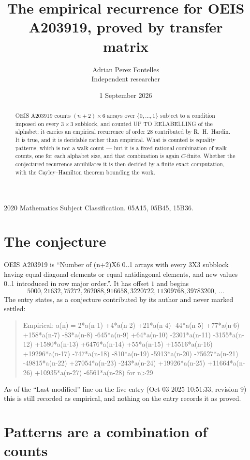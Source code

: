 \documentclass[11pt,a4paper]{article}
\title{The empirical recurrence for OEIS A203919, proved by transfer matrix}
\author{Adrian Perez Fontelles\\ \small Independent researcher}
\date{1 September 2026}
\theoremstyle{plain}
\theoremstyle{definition}
\begin{document}
\maketitle

\begin{abstract}
OEIS A203919 counts $(n+2)\times6$ arrays over $\{0,\dots,1\}$ subject to a condition imposed on
every $3\times3$ subblock, and counted UP TO RELABELLING of the
alphabet; it carries an empirical recurrence of order $28$ contributed by
R.~H.~Hardin. It is true, and it is decidable rather than empirical. What is counted is
equality patterns, which is not a walk count --- but it is a fixed rational combination of
walk counts, one for each alphabet size, and that combination is again $C$-finite. Whether the
conjectured recurrence annihilates it is then decided by a finite exact computation, with the
Cayley--Hamilton theorem bounding the work.
\end{abstract}

\noindent\small 2020 Mathematics Subject Classification. 05A15, 05B45, 15B36.\normalsize

\section{The conjecture}

OEIS A203919 is ``Number of (n+2)X6 0..1 arrays with every 3X3 subblock having equal diagonal elements or equal antidiagonal elements, and new values 0..1 introduced in row major order.''. It has offset $1$ and begins
\[
5000, 21632, 75272, 262088, 916658, 3220722, 11309768, 39783200,\ \dots
\]
The entry states, as a conjecture contributed by its author and never marked settled:
\begin{quote}
Empirical: a(n) = 2*a(n-1) +4*a(n-2) +21*a(n-4) -44*a(n-5) +77*a(n-6) +158*a(n-7) -83*a(n-8) -645*a(n-9) +64*a(n-10) -2301*a(n-11) -3155*a(n-12) +1580*a(n-13) +6476*a(n-14) +55*a(n-15) +15516*a(n-16) +19296*a(n-17) -747*a(n-18) -810*a(n-19) -5913*a(n-20) -75627*a(n-21) -49815*a(n-22) +27054*a(n-23) -243*a(n-24) +19926*a(n-25) +11664*a(n-26) +10935*a(n-27) -6561*a(n-28) for n>29
\end{quote}
As of the ``Last modified'' line on the live entry (Oct 03 2025 10:51:33, revision 9) this is still
recorded as empirical, and nothing on the entry records it as proved.

\section{Patterns are a combination of counts}
\end{document}
